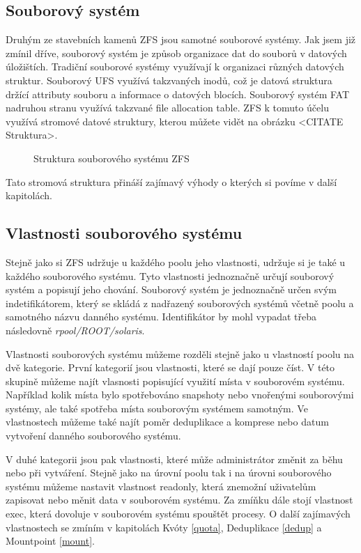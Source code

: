     \subsection{Souborový systém}
    Druhým ze stavebních kamenů ZFS jsou samotné souborové systémy. Jak jsem již zmínil dříve, souborový systém je způsob organizace dat do souborů v datových úložištích.
    Tradiční souborové systémy využívají k organizaci různých datových struktur. Souborový UFS využívá takzvaných inodů, což je datová struktura držící attributy souboru a informace o datových blocích. Souborový systém FAT nadruhou stranu využívá takzvané file allocation table. ZFS k tomuto účelu využívá stromové datové struktury, kterou můžete vidět na obrázku <CITATE Struktura>. \begin{figure}[!h]
        \caption{Struktura souborového systému ZFS}
        \label{structure}
    \end{figure}

    Tato stromová struktura přináší zajímavý výhody o kterých si povíme v další kapitolách.
    \subsection{Vlastnosti souborového systému}
    Stejně jako si ZFS udržuje u každého poolu jeho vlastnosti, udržuje si je také u každého souborového systému. Tyto vlastnosti jednoznačně určují souborový systém a popisují jeho chování. Souborový systém je jednoznačně určen svým indetifikátorem, který se skládá z nadřazený souborových systémů včetně poolu a samotného názvu danného systému. Identifikátor by mohl vypadat třeba následovně \emph{rpool/ROOT/solaris}.

    Vlastnosti souborových systému můžeme rozděli stejně jako u vlastností poolu na dvě kategorie. První kategorií jsou vlastnosti, které se dají pouze číst. V této skupině můžeme najít vlasnosti popisující využití místa v souborovém systému. Například kolik místa bylo spotřebováno snapshoty nebo vnořenými souborovými systémy, ale také spotřeba místa souborovým systémem samotným. Ve vlastnostech můžeme také najít poměr deduplikace a komprese nebo datum vytvoření danného souborového systému.

    V duhé kategorii jsou pak vlastnosti, které může administrátor změnit za běhu nebo při vytváření. Stejně jako na úrovní poolu tak i na úrovni souborového systému můžeme nastavit vlastnost readonly, která znemožní uživatelům zapisovat nebo měnit data v souborovém systému. Za zmíňku dále stojí vlastnost exec, která dovoluje v souborovém systému spouštět procesy. O další zajímavých vlastnostech se zmíním v kapitolách Kvóty \ref{quota}, Deduplikace \ref{dedup} a Mountpoint \ref{mount}.

